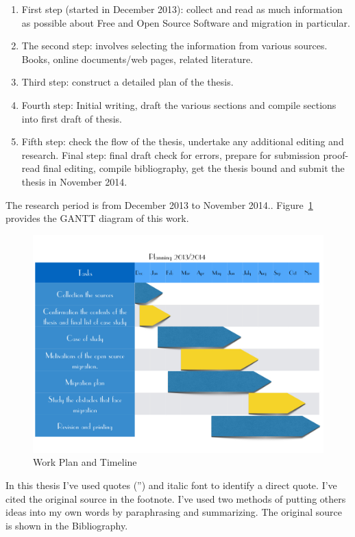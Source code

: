 \begin{enumerate}
  \item  First step (started in December 2013): collect and read as much information as possible about Free and Open Source Software and migration in particular.
  \item The second step: involves selecting the information from various sources. Books, online documents/web pages, related literature.
  \item Third step: construct a detailed plan of the thesis.
  \item Fourth step: Initial writing, draft the various sections and compile sections into first draft of thesis. 
  \item Fifth step: check the flow of the thesis, undertake any additional editing and research. Final step: final draft check for errors, prepare for submission proof-read  final editing, compile bibliography, get the thesis bound and submit the thesis in November 2014.
\end{enumerate}
 
The research period is from December 2013 to November 2014.. Figure~\ref{fig:planning} provides the GANTT diagram of this work.

   \begin{figure}[H]
    \centering
        \includegraphics[scale=0.45]{img/planning.jpg}
      \caption{Work Plan and Timeline}
      \label{fig:planning}
    \end{figure}

In this thesis I've used quotes ('') and italic font to identify a direct quote. I've cited the original source in the footnote. I've used two methods of putting others ideas into my own words by paraphrasing and summarizing. The original source is shown in the Bibliography.

